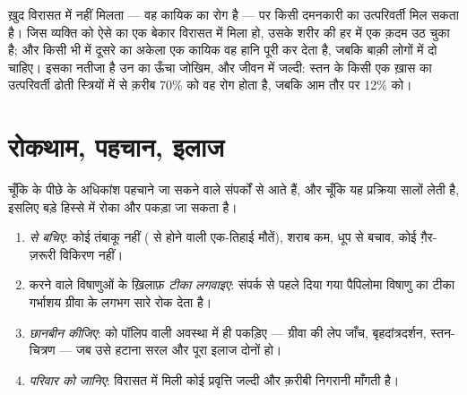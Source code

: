 \begin{proposition}[विरासत में मिली प्रवृत्ति]\label{prop:g11:cancer:inherited}
 ख़ुद विरासत में नहीं मिलता --- वह कायिक  का रोग है ---
पर किसी दमनकारी  का उत्परिवर्ती  मिल सकता है। जिस व्यक्ति को ऐसे
 का एक बेकार  विरासत में मिला हो, उसके शरीर की हर  में एक
क़दम उठ चुका है; और किसी भी  में दूसरे  का अकेला एक कायिक
 वह हानि पूरी कर देता है, जबकि बाक़ी लोगों में दो चाहिए। इसका
नतीजा है उन  का ऊँचा जोखिम, और जीवन में जल्दी: स्तन  के किसी
एक ख़ास  का उत्परिवर्ती  ढोती स्त्रियों में से क़रीब 70\% को वह
रोग होता है, जबकि आम तौर पर 12\% को।
\end{proposition}
\admitted

\section{रोकथाम, पहचान, इलाज}

\begin{method}[जोखिम घटाना]\label{met:g11:cancer:prevention}
चूँकि  के पीछे के अधिकांश  पहचाने जा सकने वाले संपर्कों
से आते हैं, और चूँकि यह प्रक्रिया सालों लेती है, इसलिए  बड़े हिस्से
में रोका और पकड़ा जा सकता है।
\begin{enumerate}
  \item \emph{ से बचिए}: कोई तंबाकू नहीं ( से होने
        वाली एक-तिहाई मौतें), शराब कम, धूप से बचाव, कोई ग़ैर-ज़रूरी
        विकिरण नहीं।
  \item {} करने वाले विषाणुओं के ख़िलाफ़ \emph{टीका लगवाइए}: संपर्क से
        पहले दिया गया पैपिलोमा विषाणु का टीका गर्भाशय ग्रीवा के लगभग सारे
         रोक देता है।
  \item \emph{छानबीन कीजिए}:  को पॉलिप वाली अवस्था में ही पकड़िए ---
        ग्रीवा की लेप जाँच, बृहदांत्रदर्शन, स्तन-चित्रण --- जब उसे हटाना
        सरल और पूरा इलाज दोनों हो।
  \item \emph{परिवार को जानिए}: विरासत में मिली कोई प्रवृत्ति जल्दी और
        क़रीबी निगरानी माँगती है।
\end{enumerate}
\end{method}

